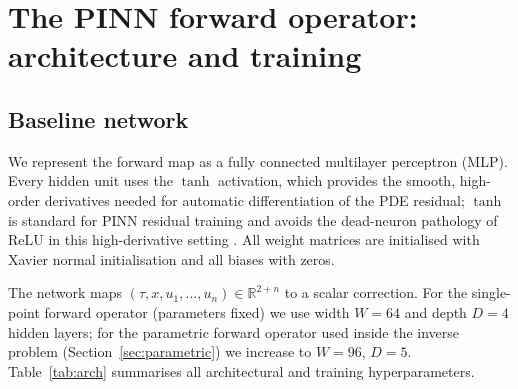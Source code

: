 \documentclass[preprint,12pt]{elsarticle}
\begin{document}
\section{The PINN forward operator: architecture and training}
\label{sec:arch}

\subsection{Baseline network}
We represent the forward map as a fully connected multilayer perceptron (MLP).
Every hidden unit uses the $\tanh$ activation, which provides the smooth,
high-order derivatives needed for automatic differentiation of the PDE residual;
$\tanh$ is standard for PINN residual training and avoids the dead-neuron
pathology of ReLU in this high-derivative setting \citep{raissi2019physics}. All
weight matrices are initialised with Xavier normal initialisation
\citep{glorot2010understanding} and all biases with zeros.

The network maps $(\tau, x, u_1,\ldots,u_n) \in \mathbb{R}^{2+n}$ to a scalar
correction. For the single-point forward operator (parameters fixed) we use
width $W{=}64$ and depth $D{=}4$ hidden layers; for the parametric forward
operator used inside the inverse problem (Section~\ref{sec:parametric}) we
increase to $W{=}96$, $D{=}5$. Table~\ref{tab:arch} summarises all architectural
and training hyperparameters.
\end{document}
